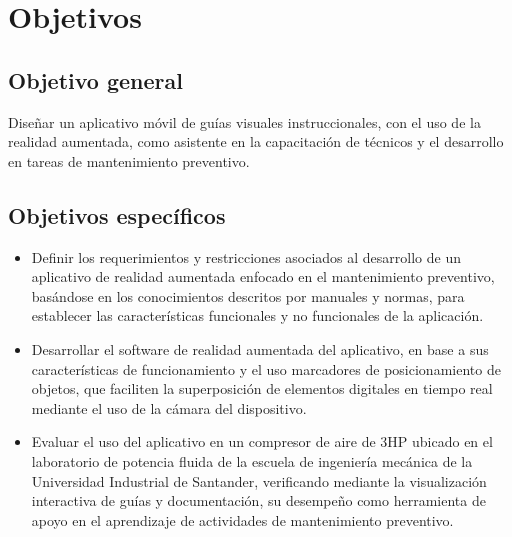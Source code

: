 \section{Objetivos}

    \subsection{Objetivo general}

        Diseñar un aplicativo móvil de guías visuales instruccionales, con el uso de la realidad aumentada, como asistente en la capacitación de técnicos y el desarrollo en tareas de mantenimiento preventivo.
    
    \subsection{Objetivos específicos}

        \begin{itemize}
            
            \item Definir los requerimientos y restricciones asociados al desarrollo de un aplicativo de realidad aumentada enfocado en el mantenimiento preventivo, basándose en los conocimientos descritos por manuales y normas, para establecer las características funcionales y no funcionales de la aplicación.
        
            \item Desarrollar el software de realidad aumentada del aplicativo, en base a sus características de funcionamiento y el uso marcadores de posicionamiento de objetos, que faciliten la superposición de elementos digitales en tiempo real mediante el uso de la cámara del dispositivo.
        
            \item Evaluar el uso del aplicativo en un compresor de aire de 3HP ubicado en el laboratorio de potencia fluida de la escuela de ingeniería mecánica de la Universidad Industrial de Santander, verificando mediante la visualización interactiva de guías y documentación, su desempeño como herramienta de apoyo en el aprendizaje de actividades de mantenimiento preventivo.

        \end{itemize}
